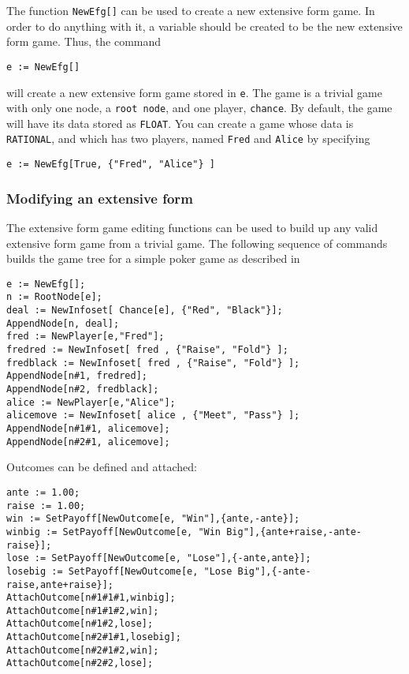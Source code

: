 The function {\tt NewEfg[]} can be used to create a new extensive form game.
In order to do anything with it, a variable should be created to be
the new extensive form game.  Thus, the command

\begin{verbatim}
e := NewEfg[]
\end{verbatim}

\noindent will create a new extensive form game stored in \verb+e+.  The game 
is a trivial game with only one node, a \verb+root node+, and one
player, \verb+chance+.  By default, the game will have its data stored
as \verb+FLOAT+.  You can create a game whose data is \verb+RATIONAL+,
and which has two players, named \verb+Fred+ and \verb+Alice+  by
specifying 


\begin{verbatim}
e := NewEfg[True, {"Fred", "Alice"} ]
\end{verbatim}

\subsubsection{Modifying an extensive form}

The extensive form game editing functions can be used to build up any
valid extensive form game from a trivial game.  The following sequence
of commands builds the game tree for a simple poker game as described
in \cite{Mye:91}

\begin{verbatim}
e := NewEfg[];
n := RootNode[e];
deal := NewInfoset[ Chance[e], {"Red", "Black"}];
AppendNode[n, deal];
fred := NewPlayer[e,"Fred"];
fredred := NewInfoset[ fred , {"Raise", "Fold"} ];
fredblack := NewInfoset[ fred , {"Raise", "Fold"} ];
AppendNode[n#1, fredred];
AppendNode[n#2, fredblack];
alice := NewPlayer[e,"Alice"];
alicemove := NewInfoset[ alice , {"Meet", "Pass"} ];
AppendNode[n#1#1, alicemove]; 
AppendNode[n#2#1, alicemove]; 
\end{verbatim}

\noindent Outcomes can be defined and attached:

\begin{verbatim}
ante := 1.00;
raise := 1.00;
win := SetPayoff[NewOutcome[e, "Win"],{ante,-ante}];
winbig := SetPayoff[NewOutcome[e, "Win Big"],{ante+raise,-ante-raise}];
lose := SetPayoff[NewOutcome[e, "Lose"],{-ante,ante}];
losebig := SetPayoff[NewOutcome[e, "Lose Big"],{-ante-raise,ante+raise}];
AttachOutcome[n#1#1#1,winbig];
AttachOutcome[n#1#1#2,win];
AttachOutcome[n#1#2,lose];
AttachOutcome[n#2#1#1,losebig];
AttachOutcome[n#2#1#2,win];
AttachOutcome[n#2#2,lose];
\end{verbatim}

